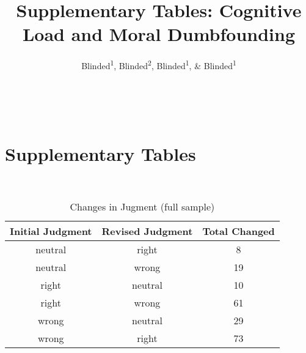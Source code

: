 \documentclass[
  american,
  man,floatsintext]{apa7}
\title{Supplementary Tables: Cognitive Load and Moral Dumbfounding}
\author{Blinded\textsuperscript{1}, Blinded\textsuperscript{2}, Blinded\textsuperscript{1}, \& Blinded\textsuperscript{1}}
\date{}
\affiliation{\vspace{0.5cm}\textsuperscript{1} Blinded\\\textsuperscript{2} Blinded}
\begin{document}
\maketitle

~

\hypertarget{supplementary-tables}{%
\section{Supplementary Tables}\label{supplementary-tables}}

\newpage

~

\begin{table}[tbp]

\begin{center}
\begin{threeparttable}

\caption{\label{tab:tabS6change}Changes in Jugment (full sample)}

\begin{tabular}{ccc}
\toprule
Initial Judgment & \multicolumn{1}{c}{Revised Judgment} & \multicolumn{1}{c}{Total Changed}\\
\midrule
neutral & right & 8\\
neutral & wrong & 19\\
right & neutral & 10\\
right & wrong & 61\\
wrong & neutral & 29\\
wrong & right & 73\\
\bottomrule
\end{tabular}

\end{threeparttable}
\end{center}

\end{table}
\end{document}
